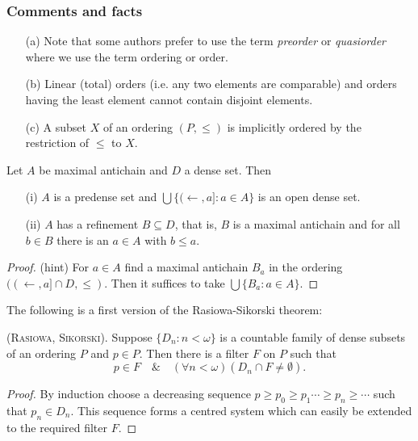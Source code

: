 \subsubsection{Comments and facts}

\begin{itemize}
 \item[(a)] Note that some authors prefer to use the term \emph{preorder} or \emph{quasiorder} where we use the term ordering or order.
 \item[(b)] Linear (total) orders (i.e. any two elements are comparable) and orders having the least element cannot contain disjoint elements.
 \item[(c)] A subset $X$ of an ordering $(P,\leq)$ is implicitly ordered by the restriction of $\leq$ to $X$.
\end{itemize}

\begin{fact}\label{dense_equivalents} Let $A$ be maximal antichain and $D$ a dense set. Then
 \begin{itemize}
  \item[(i)]  $A$ is a predense set and $\bigcup\{(\leftarrow, a]:a\in A\}$ is an open dense set.
  \item[(ii)]  $A$ has a refinement $B\subseteq D$, that is, $B$ is a maximal antichain and for all
              $b\in B$ there is an $a\in A$ with $b\leq a$.
 \end{itemize}
\end{fact}


\begin{proof} (hint) For $a\in A$ find a maximal antichain $B_a$ in the ordering $((\leftarrow,a]\cap D,\leq)$.
              Then it suffices to take $\bigcup \{B_a:a\in A\}$.
\end{proof}

The following is a first version of the Rasiowa-Sikorski theorem:

\begin{theorem}\label{rasiowa-sikorski}
{\scshape (Rasiowa, Sikorski).} Suppose $\{D_n:n<\omega\}$ is a countable family of dense subsets of an ordering $P$ and $p\in P$.
Then there is a filter $F$ on $P$ such that
$$ %
p\in F\quad\&\quad (\forall n<\omega)(D_n\cap F\neq\emptyset).
$$ %
\end{theorem}
\begin{proof} By induction choose a decreasing sequence $p\geq p_0\geq p_1\cdots\geq p_n\geq\cdots$ such that $p_n\in D_n$. This sequence forms a centred system which
can easily be extended to the required filter $F$.
\end{proof}

